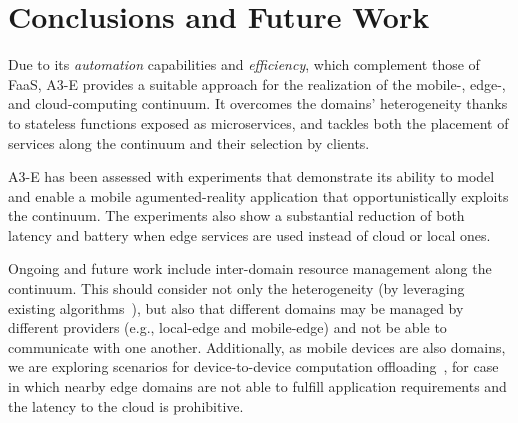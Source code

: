 \section{Conclusions and Future Work}\label{sec:conclusions}

Due to its \textit{automation} capabilities and \textit{efficiency}, which complement those of FaaS, A3-E provides a suitable approach for the realization of the mobile-, edge-, and cloud-computing continuum. It overcomes the domains' heterogeneity thanks to stateless functions exposed as microservices, and tackles both the placement of services along the continuum and their selection by clients.

A3-E has been assessed with experiments that demonstrate its ability to model and enable a mobile agumented-reality application that opportunistically exploits the continuum. The experiments also show a substantial reduction of both latency and battery when edge services are used instead of cloud or local ones. 

Ongoing and future work include inter-domain resource management along the continuum. This should consider not only the heterogeneity (by leveraging existing algorithms~\cite{Tarneberg2017}), but also that different domains may be managed by different providers (e.g., local-edge and mobile-edge) and not be able to communicate with one another. Additionally, as mobile devices are also domains, we are exploring scenarios for device-to-device computation offloading~\cite{Mendonca2016A3droid}, for case in which nearby edge domains are not able to fulfill application requirements and the latency to the cloud is prohibitive.
